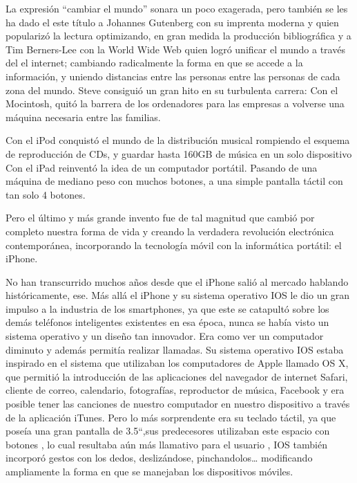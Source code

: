 La expresión “cambiar el mundo” sonara un poco exagerada,
pero también se les ha dado el este título a Johannes Gutenberg
con su imprenta moderna y quien popularizó la lectura
optimizando, en gran medida la producción bibliográfica y a
Tim Berners-Lee con la World Wide Web quien logró unificar el
mundo a través del el internet; cambiando radicalmente la forma
en que se accede a la información, y uniendo distancias entre las
personas entre las personas de cada zona del mundo. Steve
consiguió un gran hito en su turbulenta carrera:
Con el Mocintosh, quitó la barrera de los ordenadores para las
empresas a volverse una máquina necesaria entre las familias.

Con el iPod conquistó el mundo de la distribución musical
rompiendo el esquema de reproducción de CDs, y guardar hasta
160GB de música en un solo dispositivo
Con el iPad reinventó la idea de un computador portátil. Pasando
de una máquina de mediano peso con muchos botones, a una
simple pantalla táctil con tan solo 4 botones.

Pero el último y más grande invento fue de tal magnitud que
cambió por completo nuestra forma de vida y creando la
verdadera revolución electrónica contemporánea, incorporando
la tecnología móvil con la informática portátil: el iPhone.

No han transcurrido muchos años desde que el iPhone salió al
mercado hablando históricamente, ese. Más allá el iPhone y su
sistema operativo IOS le dio un gran impulso a la industria de
los smartphones, ya que este se catapultó sobre los demás
teléfonos inteligentes existentes en esa época, nunca se había
visto un sistema operativo y un diseño tan innovador. Era como
ver un computador diminuto y además permitía realizar
llamadas. Su sistema operativo IOS estaba inspirado en el
sistema que utilizaban los computadores de Apple llamado OS X,
que permitió la introducción de las aplicaciones del navegador
de internet Safari, cliente de correo, calendario, fotografías,
reproductor de música, Facebook y era posible tener las
canciones de nuestro computador en nuestro dispositivo a
través de la aplicación iTunes. Pero lo más sorprendente era su
teclado táctil, ya que poseía una gran pantalla de 3.5“,sus
predecesores utilizaban este espacio con botones , lo cual
resultaba aún más llamativo para el usuario , IOS también
incorporó gestos con los dedos, deslizándose, pinchandolos…
modificando ampliamente la forma en que se manejaban los
dispositivos móviles.

